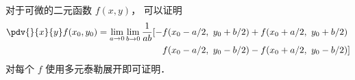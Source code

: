 
\begin{issues}
\issueDraft
\end{issues}


对于可微的二元函数 $f(x,y)$， 可以证明
\begin{equation}
\begin{aligned}
\pdv{}{x}{y} f(x_0,y_0) = \lim_{a\to 0}\lim_{b\to 0}\frac{1}{ab}[-& f(x_0-a/2,\ y_0+b/2) + f(x_0+a/2,\  y_0+b/2)\\
& f(x_0-a/2,\  y_0-b/2) - f(x_0+a/2,\  y_0-b/2)]
\end{aligned}
\end{equation}
对每个 $f$ 使用多元泰勒展开即可证明．
